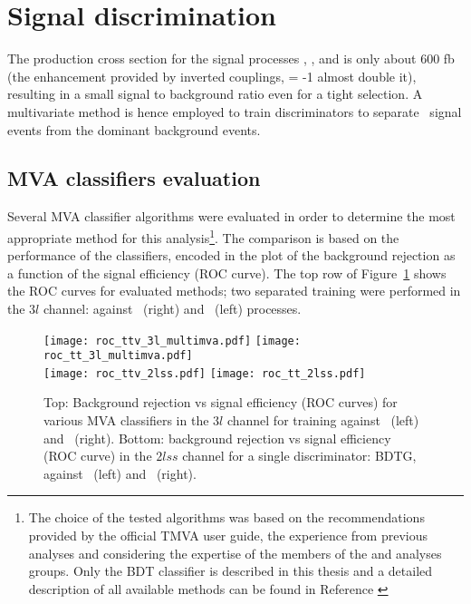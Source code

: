 \section{Signal discrimination }
\label{secc:signal_disc}

The production cross section for the signal processes \tHq, \tHW, and \ttH is only about 600 fb (the enhancement provided by inverted couplings, \Ct = -1 almost double it), resulting in a small signal to background ratio even for a tight selection. A multivariate method is hence employed to train discriminators to separate \tH\ signal events from the dominant background events.

\subsection{MVA classifiers evaluation}

Several MVA classifier algorithms were evaluated in order to determine the most appropriate method for this analysis\footnote{The choice of the tested algorithms was based on the recommendations provided by the official TMVA user guide, the experience from previous analyses and considering the expertise of the members of the \tHq and \ttH analyses groups. Only the BDT classifier is described in this thesis and a detailed description of all available methods can be found in Reference \cite{tmva}}. The comparison is based on the performance of the classifiers, encoded in the plot of the background rejection as a function of the signal efficiency (ROC curve). The top row of Figure~\ref{roc} shows the ROC curves for evaluated methods; two separated training were performed in the $3l$ channel: against \ttbar\ (right) and \ttV\ (left) processes.

\begin{figure} [!h]
  \centering
   \texttt{[image: roc\_ttv\_3l\_multimva.pdf]}
   \texttt{[image: roc\_tt\_3l\_multimva.pdf]} \\
   \texttt{[image: roc\_ttv\_2lss.pdf]}
   \texttt{[image: roc\_tt\_2lss.pdf]} 

\caption[MVA classifiers performance.]{ Top: Background rejection vs signal efficiency (ROC curves) for various MVA classifiers in the $3l$ channel for training against \ttV\ (left) and \ttbar\ (right). Bottom: background rejection vs signal efficiency (ROC curve) in the $2lss$ channel for a single discriminator: BDTG, against \ttV\ (left) and \ttbar\ (right).}
\label{roc}
\end{figure} 

